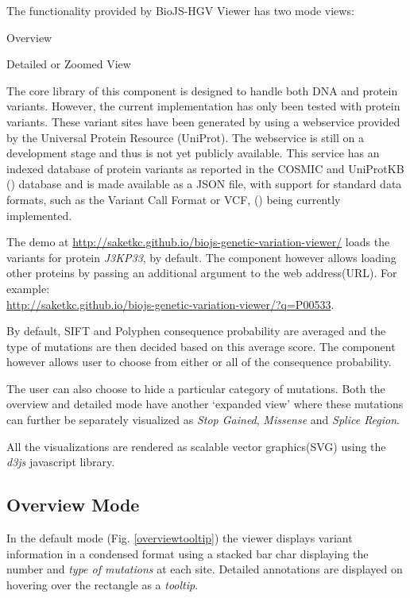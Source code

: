 \documentclass{bioinfo}
\begin{document}
The functionality provided by BioJS-HGV Viewer has two mode views: 
\begin{inparaenum}[(a)]
	\item Overview
	\item Detailed or Zoomed View
\end{inparaenum}

The core library of this component is designed to handle both DNA and protein variants. However, the current implementation has only been tested with protein variants. These variant sites have been generated by using a webservice provided by the Universal Protein Resource (UniProt). The webservice is still on a development stage and thus is not yet publicly available. This service has an indexed database of protein variants as reported in the COSMIC and UniProtKB (\cite{uniprot2014activities}) database and is made available as a JSON file, with support for standard data formats, such as the Variant Call Format or VCF, (\cite{danecek2011variant}) being currently implemented.

The demo at \href{http://saketkc.github.io/biojs-genetic-variation-viewer/}{http://saketkc.github.io/biojs-genetic-variation-viewer/} loads the variants for protein \textit{J3KP33}, by default. The component however allows loading other proteins by passing an additional argument to the web address(URL). For example:\\ \href{http://saketkc.github.io/biojs-genetic-variation-viewer/?q=P00533}{http://saketkc.github.io/biojs-genetic-variation-viewer/?q=P00533}.

By default, SIFT and Polyphen consequence probability are averaged and the type of mutations are then decided based on this average score. The component however allows user to choose from either or all of the consequence probability.

The user can also choose to hide a particular category of mutations. Both the overview and detailed mode have another `expanded view' where these mutations can further be separately visualized as \textit{Stop Gained}, \textit{Missense} and \textit{Splice Region}.

All the visualizations are rendered as scalable vector graphics(SVG) using the \textit{d3js} javascript library.

\subsection{Overview Mode}

In the default mode (Fig. \ref{overviewtooltip}) the viewer displays variant information in a condensed format using a stacked bar char displaying the number and \textit{type of mutations} at each site. Detailed annotations are displayed on hovering over the rectangle as a \textit{tooltip}.
\end{document}

